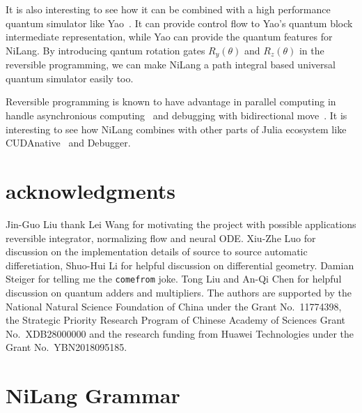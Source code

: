 \documentclass[aps,twocolumn,longbibliography,english,superscriptaddress]{revtex4-1}
\newcommand{\<}{\langle}
\renewcommand{\>}{\rangle}
\newcommand{\blue}[1]{[{\bf  \color{blue}{JG: #1}}]}
\theoremstyle{definition}\newtheorem{definition}{\textit{Definition}}
\begin{document}
It is also interesting to see how it can be combined with a high performance quantum simulator like Yao~\cite{Luo2019}. It can provide control flow to Yao's quantum block intermediate representation, while Yao can provide the quantum features for NiLang.
By introducing qantum rotation gates $R_y(\theta)$ and $R_z(\theta)$ in the reversible programming, we can make NiLang a path integral based universal quantum simulator easily too.

Reversible programming is known to have advantage in parallel computing in handle asynchronious computing~\cite{Jefferson1985} and debugging with bidirectional move~\cite{Boothe2000}.
It is interesting to see how NiLang combines with other parts of Julia ecosystem like CUDAnative~\cite{Besard2018} and Debugger.

\section{acknowledgments}
Jin-Guo Liu thank Lei Wang for motivating the project with possible applications reversible integrator, normalizing flow and neural ODE.
Xiu-Zhe Luo for discussion on the implementation details of source to source automatic differetiation,
Shuo-Hui Li for helpful discussion on differential geometry.
Damian Steiger for telling me the \texttt{comefrom} joke.
Tong Liu and An-Qi Chen for helpful discussion on quantum adders and multipliers.
The authors are supported by the National Natural Science Foundation of China under the Grant No.~11774398, the Strategic Priority Research Program of Chinese Academy of Sciences Grant No.~XDB28000000 and the research funding from Huawei Technologies under the Grant No.~YBN2018095185.




\pagebreak
\appendix

\section{NiLang Grammar}\label{app:grammar}
\end{document}
